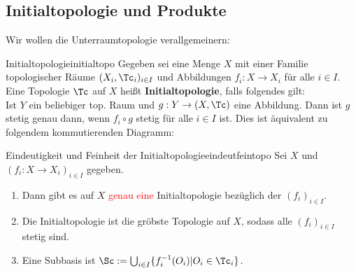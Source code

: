\subsection{Initialtopologie und Produkte}
\label{subsec:initialtopoprodukte}
Wir wollen die Unterraumtopologie verallgemeinern:
\begin{definition}{Initialtopologie}{initialtopo}
Gegeben sei eine Menge $X$ mit einer Familie topologischer Räume $(X_i, \Tc_i)_{i \in I}$ und Abbildungen $f_i: X \to X_i$ für alle $i \in I$. Eine Topologie $\Tc$ auf $X$ heißt \textbf{Initialtopologie}, falls folgendes gilt:\\
Ist $Y$ ein beliebiger top. Raum und $g: Y \to (X, \Tc)$ eine Abbildung. Dann ist $g$ stetig genau dann, wenn $f_i \circ g$ stetig für alle $i \in I$ ist. Dies ist äquivalent zu folgendem kommutierenden Diagramm:
\begin{center}
\end{center}
\end{definition}
\begin{satz}{Eindeutigkeit und Feinheit der Initialtopologie}{eindeutfeintopo}
Sei $X$ und $(f_i: X \to X_i)_{i \in I}$ gegeben. 
\begin{enumerate}
\item Dann gibt es auf $X$ \textcolor{red}{genau eine} Initialtopologie bezüglich der $(f_i)_{i \in I}$.
\item Die Initialtopologie ist die gröbste Topologie auf $X$, sodass alle $(f_i)_{i\in I}$ stetig sind.
\item Eine Subbasis ist $\Sc := \bigcup_{i \in I} \{f_i^{-1} (O_i) | O_i \in \Tc_i\}$.
\end{enumerate}
\end{satz}
